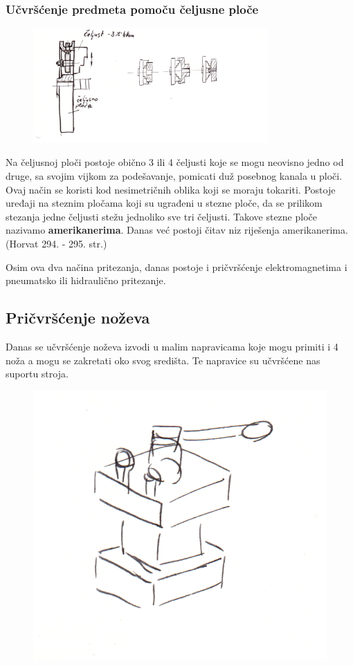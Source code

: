 \documentclass[a4paper,12pt]{article}
\numberwithin{figure}{section}
\begin{document}
\subsubsection{Učvršćenje predmeta pomoču čeljusne ploče}
\begin{figure}[!h]
\centering
\includegraphics[width=0.8\textwidth]{image_19-1.png}
\end{figure}
\FloatBarrier
Na čeljusnoj ploči postoje obično 3 ili 4 čeljusti koje se mogu neovisno jedno od druge, sa svojim vijkom za podešavanje, pomicati duž posebnog kanala u ploči. Ovaj način se koristi kod nesimetričnih oblika koji se moraju tokariti. Postoje uređaji na steznim pločama koji su ugrađeni u stezne ploče, da se prilikom stezanja  jedne čeljusti stežu jednoliko sve tri čeljusti. Takove stezne ploče nazivamo \textbf{amerikanerima}. Danas već postoji čitav niz riješenja amerikanerima. (Horvat 294. - 295. str.)\par
Osim ova dva načina pritezanja, danas postoje i pričvršćenje elektromagnetima i pneumatsko ili hidraulično pritezanje.
\subsection{Pričvršćenje noževa}
Danas se učvršćenje noževa izvodi u malim napravicama koje mogu primiti i 4 noža a mogu se zakretati oko svog središta. Te napravice su učvršćene nas suportu stroja.
\begin{figure}[!h]
\centering
\includegraphics[scale=0.15]{image_19-2.png}
\end{figure}
\FloatBarrier
\newpage
\end{document}

